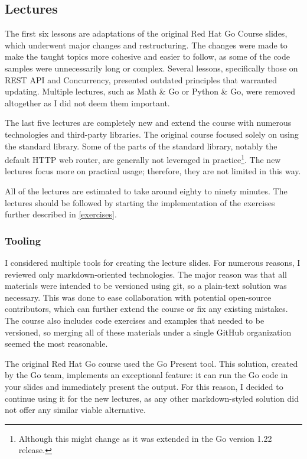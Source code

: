 \documentclass[
  digital,
  color,
  oneside,
  nosansbold,
  nocolorbold,
  nolof,
  nolot,
]{fithesis4}
\begin{document}
\subsection{Lectures}

The first six lessons are adaptations of the original Red Hat Go Course slides, which underwent major changes and restructuring. The changes were made to make the taught topics more cohesive and easier to follow, as some of the code samples were unnecessarily long or complex. Several lessons, specifically those on REST API and Concurrency, presented outdated principles that warranted updating. Multiple lectures, such as Math \& Go or Python \& Go, were removed altogether as I did not deem them important.

The last five lectures are completely new and extend the course with numerous technologies and third-party libraries. The original course focused solely on using the standard library. Some of the parts of the standard library, notably the default HTTP web router, are generally not leveraged in practice\footnote{Although this might change as it was extended in the Go version 1.22 release.}. The new lectures focus more on practical usage; therefore, they are not limited in this way.

All of the lectures are estimated to take around eighty to ninety minutes. The lectures should be followed by starting the implementation of the exercises further described in \cref{exercises}.

\subsubsection{Tooling}

I considered multiple tools for creating the lecture slides. For numerous reasons, I reviewed only markdown-oriented technologies. The major reason was that all materials were intended to be versioned using git, so a plain-text solution was necessary. This was done to ease collaboration with potential open-source contributors, which can further extend the course or fix any existing mistakes. The course also includes code exercises and examples that needed to be versioned, so merging all of these materials under a single GitHub organization seemed the most reasonable.

The original Red Hat Go course used the Go Present tool\cite{go-present}. This solution, created by the Go team, implements an exceptional feature: it can run the Go code in your slides and immediately present the output. For this reason, I decided to continue using it for the new lectures, as any other markdown-styled solution did not offer any similar viable alternative.
\end{document}
